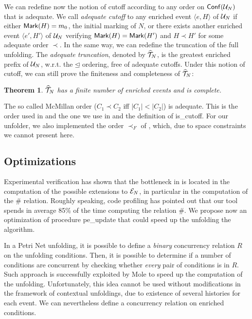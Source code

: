 \documentclass[11pt,a4paper]{article}
\newtheorem{theorem}{Theorem}
\newcommand{\conf}[1]{\ensuremath{\mathsf{Conf}(#1)}}
\newcommand{\confl}{\ensuremath{\mathord{\#}}}
\newcommand{\peupdate}{\mbox{\sf pe\_update}}
\newcommand{\iscutoff}{\mbox{\sf is\_cutoff}}
\begin{document}
We can redefine now the notion of cutoff according to any order on $\conf{\unf
N}$ that is adequate.  We call \emph{adequate cutoff} to any enriched event
$\langle e, H \rangle$ of $\mathcal{U}_{N}$  if either $\mathsf{Mark }{(H)} = m_0$, the initial
marking of $N$, or there exists another enriched event $\langle e', H' \rangle$
of $\mathcal{U}_{N}$ verifying $\mathsf{Mark }{(H)} = \mathsf{Mark }{(H')}$ and $H \prec H'$ for some
adequate order $\prec$.  In the same way, we can redefine the truncation of the
full unfolding.  The \emph{adequate truncation}, denoted by $\widehat{\mathcal{T}}_{N}$, is the
greatest enriched prefix of $\mathcal{U}_{N}$, w.r.t. the $\unlhd$ ordering, free of
adequate cutoffs.  Under this notion of cutoff, we can still prove the
finiteness and completeness of $\widehat{\mathcal{T}}_{N}$:

\begin{theorem}
\label{thm:atrunc.has}
$\widehat{\mathcal{T}}_{N}$ has a finite number of enriched events and is complete.
\end{theorem}

The so called McMillan order ($C_1 \prec C_2$ iff $|C_1| < |C_2|$) is adequate.
This is the order used in  and the one we use in
 and the definition of \iscutoff{}.  For our
unfolder, we also implemented the order $\prec_F$ of , which, due
to space constraints we cannot present here.

\subsection{Optimizations}
\label{sec:optimizations}

Experimental verification has shown that the bottleneck in
 is located in the computation of the possible
extensions to $\mathcal{E}_{N}$, in particular in the computation of the $\confl$
relation.  Roughly speaking, code profiling has pointed out that our tool
spends in average 85\% of the time computing the relation $\confl$.  We propose
now an optimization of procedure \peupdate{} that could speed up the unfolding
the algorithm.

In a Petri Net unfolding, it is possible to define a \emph{binary} concurrency
relation $R$ on the unfolding conditions.  Then, it is possible to determine if
a number of conditions are concurrent by checking whether \emph{every} pair of
conditions is in $R$.  Such approach is successfully exploited by Mole to speed
up the computation of the unfolding.  Unfortunately, this idea cannot be used
without modifications in the framework of contextual unfoldings, due to
existence of several histories for each event.  We can nevertheless define a
concurrency relation on enriched conditions.
\end{document}
